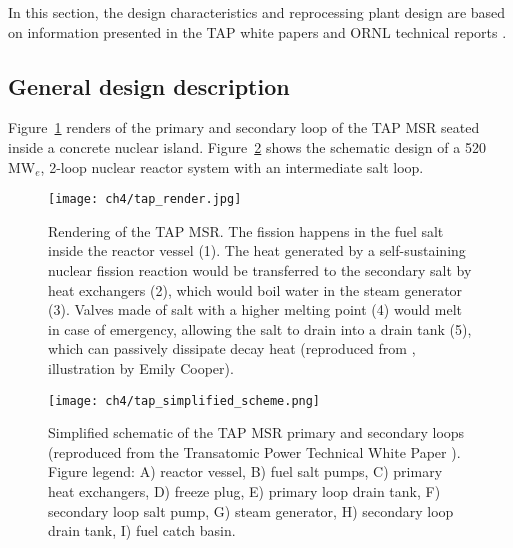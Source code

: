 In this section, the design characteristics and reprocessing plant design are 
based on information presented in the TAP white papers  
\cite{transatomic_power_corporation_technical_2016,
transatomic_power_corporation_neutronics_2016} and \gls{ORNL} technical 
reports \cite{betzler_two-dimensional_2017, betzler_assessment_2017-1}.

\subsection{General design description}

Figure~\ref{fig:tap-rendering} renders of the primary and secondary loop of 
the \gls{TAP} \gls{MSR} seated inside a concrete nuclear island. 
Figure~\ref{fig:tap-primary-scheme} shows the schematic design of a 520 
MW$_{e}$, 2-loop nuclear reactor system with an intermediate salt loop.
\begin{figure}[h] %
	\centering
	\texttt{[image: ch4/tap\_render.jpg]}
	\caption{Rendering of the \gls{TAP} \gls{MSR}. The fission happens in the 
		fuel salt inside the reactor vessel (1). The heat generated by a
		self-sustaining nuclear fission reaction would be transferred to the 
		secondary salt by heat exchangers (2), which would boil water in the 
		steam generator (3). Valves made of salt with a higher melting point 
		(4) would melt in case of emergency, allowing the salt to drain into a 
		drain tank (5), which can passively dissipate decay heat	
		(reproduced from 
		\cite{strickland_transatomic_2014}, illustration by Emily Cooper).}
	\label{fig:tap-rendering}
\end{figure}
\begin{figure}[h] %
	\centering
	\texttt{[image: ch4/tap\_simplified\_scheme.png]}
	\caption{Simplified schematic of the \gls{TAP} \gls{MSR} primary and  
		secondary loops (reproduced from the Transatomic Power Technical White 
		Paper \cite{transatomic_power_corporation_technical_2016}). Figure 
		legend: 
		A) reactor vessel, B) fuel salt pumps, C) primary heat exchangers, D) 
		freeze plug, E) primary loop drain tank, F) secondary loop salt pump, 
		G) 
		steam generator, H) secondary loop drain tank, I) fuel catch basin.}
	\label{fig:tap-primary-scheme}
\end{figure}

